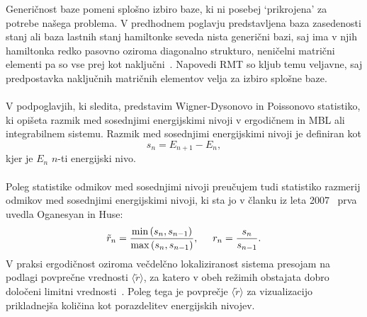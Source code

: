 \documentclass[10pt,a4paper]{article}
\begin{document}
 Generičnost baze pomeni splošno izbiro baze, ki ni posebej `prikrojena' za potrebe našega problema. V predhodnem poglavju predstavljena baza zasedenosti stanj ali baza lastnih stanj hamiltonke seveda nista generični bazi, saj ima v njih hamiltonka redko pasovno oziroma diagonalno strukturo, neničelni matrični elementi pa so vse prej kot naključni~\cite{d2016quantum}. Napovedi RMT so kljub temu veljavne, saj predpostavka naključnih matričnih elementov velja za izbiro splošne baze. \\\\
 V podpoglavjih, ki sledita, predstavim Wigner-Dysonovo in Poissonovo statistiko, ki opišeta razmik med sosednjimi energijskimi nivoji v ergodičnem in MBL ali integrabilnem sistemu. Razmik med sosednjimi energijskimi nivoji je definiran kot 
 \begin{equation}\label{eq:razmik}
 s_n=E_{n+1}-E_n,
 \end{equation}
 kjer je $E_n$ $n$-ti energijski nivo. \\\\
 Poleg statistike odmikov med sosednjimi nivoji 
 preučujem tudi statistiko razmerij odmikov med sosednjimi energijskimi nivoji, ki sta jo v članku iz leta 2007~\cite{PhysRevB.75.155111} prva uvedla Oganesyan in Huse:
 \begin{equation}\label{eq:oganesyan_huse}
 \tilde{r}_n=\frac{\min\left(s_n,s_{n-1}\right)}{\max\left(s_n,s_{n-1}\right)}, \hspace{5mm} r_n=\frac{s_n}{s_{n-1}}.
 \end{equation}
 V praksi ergodičnost oziroma večdelčno lokaliziranost sistema presojam na podlagi povprečne vrednosti $\langle \tilde{r}\rangle$, za katero v obeh režimih obstajata dobro določeni limitni vrednosti~\cite{atas2013distribution}. Poleg tega je povprečje $\langle \tilde{r}\rangle$ za vizualizacijo prikladnejša količina kot porazdelitev energijskih nivojev. 
\end{document}
